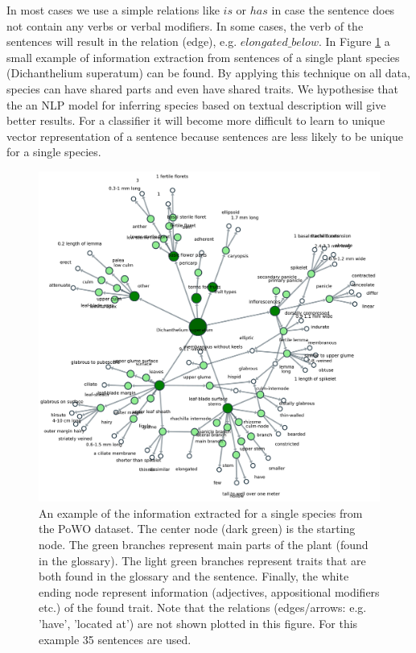 \documentclass[a4paper, 12pt, oneside]{book} %
\begin{document}
In most cases we use a simple relations like $is$ or $has$ in case the sentence does not contain any verbs or verbal modifiers.
In some cases, the verb of the sentences will result in the relation (edge), e.g. $elongated\_below$.
In Figure \ref{fig:kngraph} a small example of information extraction from sentences of a single plant species (Dichanthelium superatum) can be found.
By applying this technique on all data, species can have shared parts and even have shared traits.
We hypothesise that the an NLP model for inferring species based on textual description will give better results.
For a classifier it will become more difficult to learn to unique vector representation of a sentence because sentences are less likely to be unique for a single species.

\begin{figure} [h!]
    \centering
    \includegraphics[width=\textwidth]{figures/kngraph.pdf}
    \caption[Example of automatic information extraction]{An example of the information extracted for a single species from the PoWO dataset. The center node (dark green) is the starting node. The green branches represent main parts of the plant (found in the glossary). The light green branches represent traits that are both found in the glossary and the sentence. Finally, the white ending node represent information (adjectives, appositional modifiers etc.) of the found trait. Note that the relations (edges/arrows: e.g. 'have', 'located at') are not shown plotted in this figure. For this example 35 sentences are used.}
    \label{fig:kngraph}
\end{figure}
\end{document}
